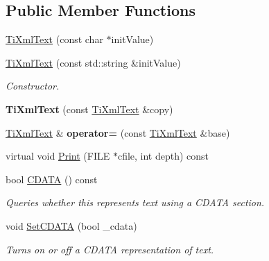 \subsection*{Public Member Functions}
\begin{DoxyCompactItemize}
\item 
\hyperlink{class_ti_xml_text_af659e77c6b87d684827f35a8f4895960}{Ti\+Xml\+Text} (const char $\ast$init\+Value)
\item 
\mbox{\label{class_ti_xml_text_a439792f6183a3d3fb6f2bc2b16fa5691}} 
\hyperlink{class_ti_xml_text_a439792f6183a3d3fb6f2bc2b16fa5691}{Ti\+Xml\+Text} (const std\+::string \&init\+Value)
\begin{DoxyCompactList}\small\item\em Constructor. \end{DoxyCompactList}\item 
\mbox{\label{class_ti_xml_text_a8d2cc1b4af2208cbb0171cf20f6815d1}} 
{\bfseries Ti\+Xml\+Text} (const \hyperlink{class_ti_xml_text}{Ti\+Xml\+Text} \&copy)
\item 
\mbox{\label{class_ti_xml_text_aed5b13f9c1b804c616fd533882c29f57}} 
\hyperlink{class_ti_xml_text}{Ti\+Xml\+Text} \& {\bfseries operator=} (const \hyperlink{class_ti_xml_text}{Ti\+Xml\+Text} \&base)
\item 
virtual void \hyperlink{class_ti_xml_text_a75f6895906333894e2574cc8cf77ea79}{Print} (F\+I\+LE $\ast$cfile, int depth) const
\item 
\mbox{\label{class_ti_xml_text_aac1f4764d220ed6bf809b16dfcb6b45a}} 
bool \hyperlink{class_ti_xml_text_aac1f4764d220ed6bf809b16dfcb6b45a}{C\+D\+A\+TA} () const
\begin{DoxyCompactList}\small\item\em Queries whether this represents text using a C\+D\+A\+TA section. \end{DoxyCompactList}\item 
\mbox{\label{class_ti_xml_text_acb17ff7c5d09b2c839393445a3de5ea9}} 
void \hyperlink{class_ti_xml_text_acb17ff7c5d09b2c839393445a3de5ea9}{Set\+C\+D\+A\+TA} (bool \+\_\+cdata)
\begin{DoxyCompactList}\small\item\em Turns on or off a C\+D\+A\+TA representation of text. \end{DoxyCompactList}\item 

\end{DoxyCompactItemize}
